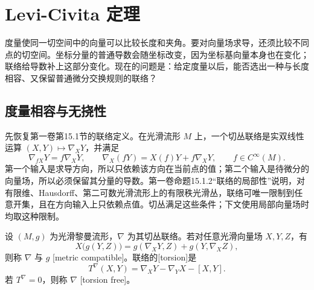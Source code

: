 
% 
% 

\section{Levi-Civita 定理}
\label{g3:sec:0102}

度量使同一切空间中的向量可以比较长度和夹角。要对向量场求导，还须比较不同点的切空间。坐标分量的普通导数会随坐标改变，因为坐标基向量本身也在变化；联络给导数补上这部分变化。现在的问题是：给定度量以后，能否选出一种与长度相容、又保留普通微分交换规则的联络？

\subsection{度量相容与无挠性}
\label{g3:subsec:0102:01}

先恢复第一卷第15.1节的联络定义。在光滑流形 \(M\) 上，一个切丛联络是实双线性运算 \((X,Y)\mapsto\nabla_XY\)，并满足
\begin{equation}\label{g3:eq:connection-rules}
	\nabla_{fX}Y=f\nabla_XY,\qquad
	\nabla_X(fY)=X(f)Y+f\nabla_XY,
	\qquad f\in C^\infty(M).
\end{equation}
第一个输入是求导方向，所以只依赖该方向在当前点的值；第二个输入是待微分的向量场，所以必须保留其分量的导数。第一卷命题15.1.2“联络的局部性”说明，对有限维、Hausdorff、第二可数光滑流形上的有限秩光滑丛，联络可唯一限制到任意开集，且在方向输入上只依赖点值。切丛满足这些条件；下文使用局部向量场时均取这种限制。

\begin{definition}\label{g3:def:metric-torsion-conditions}
	设 \((M,g)\) 为光滑黎曼流形，\(\nabla\) 为其切丛联络。若对任意光滑向量场 \(X,Y,Z\)，有
	\begin{equation}\label{g3:eq:metric-compatibility}
		X\bigl(g(Y,Z)\bigr)=g(\nabla_XY,Z)+g(Y,\nabla_XZ),
	\end{equation}
	则称 \(\nabla\) 与 \(g\) [metric compatible]。联络的[torsion]是
	\begin{equation}\label{g3:eq:torsion-definition}
		T^\nabla(X,Y)=\nabla_XY-\nabla_YX-[X,Y].
	\end{equation}
	若 \(T^\nabla=0\)，则称 \(\nabla\) [torsion free]。
\end{definition}

